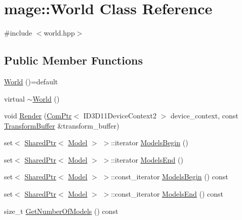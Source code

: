 \hypertarget{classmage_1_1_world}{}\section{mage\+:\+:World Class Reference}
\label{classmage_1_1_world}


{\ttfamily \#include $<$world.\+hpp$>$}

\subsection*{Public Member Functions}
\begin{DoxyCompactItemize}
\item 
\hyperlink{classmage_1_1_world_a80582236a880812f9795a28ae5523cf7}{World} ()=default
\item 
virtual \hyperlink{classmage_1_1_world_aa51807f68564554dcc2e5f4527e0a620}{$\sim$\+World} ()
\item 
void \hyperlink{classmage_1_1_world_a9431fb26a3545cb10c3d380e17c24968}{Render} (\hyperlink{namespacemage_ae74f374780900893caa5555d1031fd79}{Com\+Ptr}$<$ I\+D3\+D11\+Device\+Context2 $>$ device\+\_\+context, const \hyperlink{structmage_1_1_transform_buffer}{Transform\+Buffer} \&transform\+\_\+buffer)
\item 
set$<$ \hyperlink{namespacemage_a1e01ae66713838a7a67d30e44c67703e}{Shared\+Ptr}$<$ \hyperlink{classmage_1_1_model}{Model} $>$ $>$\+::iterator \hyperlink{classmage_1_1_world_acdbf2922c2b755fb9ff368b3bab3edb1}{Models\+Begin} ()
\item 
set$<$ \hyperlink{namespacemage_a1e01ae66713838a7a67d30e44c67703e}{Shared\+Ptr}$<$ \hyperlink{classmage_1_1_model}{Model} $>$ $>$\+::iterator \hyperlink{classmage_1_1_world_aa52fa727f94a855e55d9fed72be8fd60}{Models\+End} ()
\item 
set$<$ \hyperlink{namespacemage_a1e01ae66713838a7a67d30e44c67703e}{Shared\+Ptr}$<$ \hyperlink{classmage_1_1_model}{Model} $>$ $>$\+::const\+\_\+iterator \hyperlink{classmage_1_1_world_a38b6ada350e36132f94df20fb0365177}{Models\+Begin} () const
\item 
set$<$ \hyperlink{namespacemage_a1e01ae66713838a7a67d30e44c67703e}{Shared\+Ptr}$<$ \hyperlink{classmage_1_1_model}{Model} $>$ $>$\+::const\+\_\+iterator \hyperlink{classmage_1_1_world_ad7e9615a659dad4190b16dc28932c007}{Models\+End} () const
\item 
size\+\_\+t \hyperlink{classmage_1_1_world_a6e04fdde74a2616746cdafd12537c4a7}{Get\+Number\+Of\+Models} () const
\item 

\end{DoxyCompactItemize}
